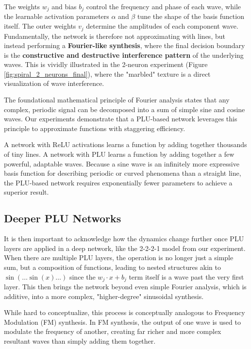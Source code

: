 \documentclass[11pt, letterpaper]{article}
\begin{document}
The weights $w_j$ and bias $b_j$ control the frequency and phase of each wave, while the learnable activation parameters $\alpha$ and $\beta$ tune the shape of the basis function itself. The outer weights $v_j$ determine the amplitudes of each component wave. Fundamentally, the network is therefore not approximating with lines, but instead performing a \textbf{Fourier-like synthesis}, where the final decision boundary is the \textbf{constructive and destructive interference pattern} of the underlying waves. This is vividly illustrated in the 2-neuron experiment (Figure \ref{fig:spiral_2_neurons_final}), where the "marbled" texture is a direct visualization of wave interference.

The foundational mathematical principle of Fourier analysis states that any complex, periodic signal can be decomposed into a sum of simple sine and cosine waves. Our experiments demonstrate that a PLU-based network leverages this principle to approximate functions with staggering efficiency.

A network with ReLU activations learns a function by adding together thousands of tiny lines. A network with PLU learns a function by adding together a few powerful, adaptable waves. Because a sine wave is an infinitely more expressive basis function for describing periodic or curved phenomena than a straight line, the PLU-based network requires exponentially fewer parameters to achieve a superior result.

\subsection{Deeper PLU Networks}

It is then important to acknowledge how the dynamics change further once PLU layers are applied in a deep network, like the 2-2-2-1 model from our experiment. When there are multiple PLU layers, the operation is no longer just a simple sum, but a composition of functions, leading to nested structures akin to $\sin(\dots\sin(x)\dots)$ since the $w_j \cdot x + b_j$ term itself is a wave past the very first layer. This then brings the network beyond even simple Fourier analysis, which is additive, into a more complex, "higher-degree" sinusoidal synthesis.

While hard to conceptualize, this process is conceptually analogous to Frequency Modulation (FM) synthesis. In FM synthesis, the output of one wave is used to modulate the frequency of another, creating far richer and more complex resultant waves than simply adding them together.
\end{document}
